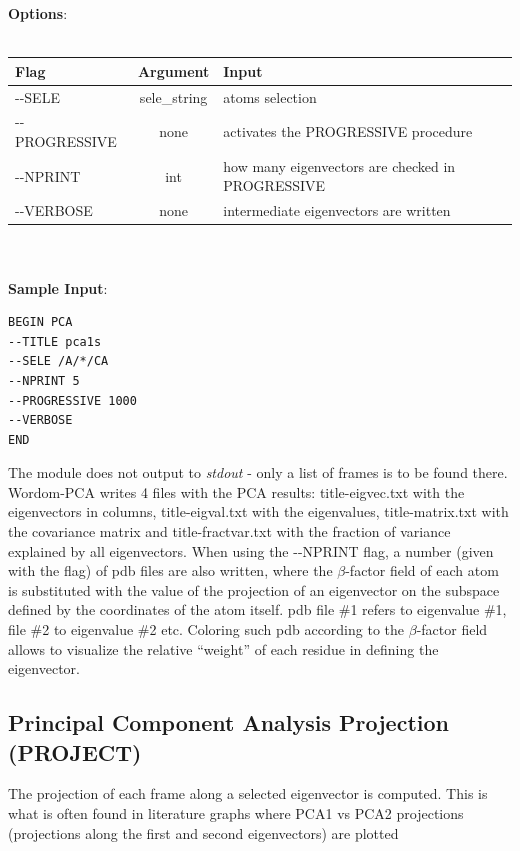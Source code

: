 \documentclass[11pt,twoside,onecolumn,a4paper,openright,notitlepage]{book}[2001/04/21]
\begin{document}
\textbf{\large Options}:\\\\
\begin{tabular}{l|c|p{8.0cm}}
Flag & Argument & Input \\
\hline
-{}-SELE          & sele\_string  & atoms selection\\
-{}-PROGRESSIVE   & none  & activates the PROGRESSIVE procedure\\
-{}-NPRINT        & int   & how many eigenvectors are checked in PROGRESSIVE\\
-{}-VERBOSE       & none  & intermediate eigenvectors are written\\
\end{tabular}\\\\

\textbf{\large Sample Input}:
\begin{verbatim}
BEGIN PCA
--TITLE pca1s
--SELE /A/*/CA
--NPRINT 5
--PROGRESSIVE 1000
--VERBOSE
END
\end{verbatim}

The module does not output to \emph{stdout} - only a list of frames is to be found there. Wordom-PCA writes 4 files with the PCA results: title-eigvec.txt with the eigenvectors in columns, title-eigval.txt with the eigenvalues, title-matrix.txt with the covariance matrix and title-fractvar.txt with the fraction of variance explained by all eigenvectors. When using the -{}-NPRINT flag, a number (given with the flag) of pdb files are also written, where the $\beta{}$-factor field of each atom is substituted with the value of the projection of an eigenvector on the subspace defined by the coordinates of the atom itself. pdb file \#1 refers to eigenvalue \#1, file \#2 to eigenvalue \#2 etc. Coloring such pdb according to the $\beta{}$-factor field allows to visualize the relative ``weight'' of each residue in defining the eigenvector.

\subsection{Principal Component Analysis Projection (PROJECT)}
The projection of each frame along a selected eigenvector is computed. This is what is often found in literature graphs where PCA1 vs PCA2 projections (projections along the first and second eigenvectors) are plotted\\
\end{document}
